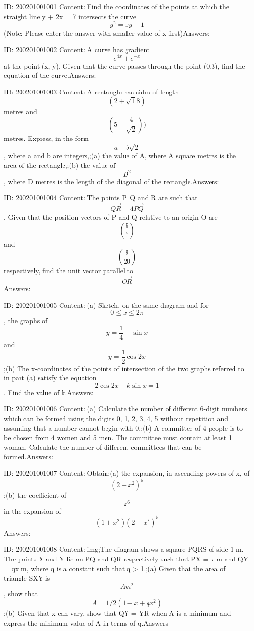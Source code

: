 \documentclass{article}
\begin{document}
ID: 200201001001
Content:
Find the coordinates of the points at which the straight line y + 2x = 7 intersects the curve $$y^2=xy-1$$ (Note: Please enter the answer with smaller value of x first)Answers:

ID: 200201001002
Content:
A curve has gradient $$e^{4x}+e^{-x}$$ at the point (x, y). Given that the curve passes through the point (0,3), find the equation of the curve.Answers:

ID: 200201001003
Content:
A rectangle has sides of length $$(2+\sqrt18)$$metres and $$(5-\frac{4}{\sqrt{2}}))$$metres. Express, in the form $$a+b\sqrt2$$, where a and b are integers,;(a)	the value of A, where A square metres is the area of the rectangle,;(b)	the value of $$D^2$$, where D metres is the length of the diagonal of the rectangle.Answers:

ID: 200201001004
Content:
The points P, Q and R are such that $$\vec{QR}=4\vec{PQ}$$. Given that the position vectors of P and Q relative to an origin O are $$\binom{6}{7}$$ and $$\binom{9}{20}$$ respectively, find the unit vector parallel to $$\vec{OR}$$Answers:

ID: 200201001005
Content:
(a)	Sketch, on the same diagram and for $$0 \leq x \leq 2\pi$$, the graphs of $$y= \frac{1}{4}+\sin x$$ and $$y= \frac{1}{2}\cos 2x$$;(b)	The x-coordinates of the points of intersection of the two graphs referred to in part (a) satisfy the equation $$2 \cos  2x-k \sin  x = 1$$. Find the value of k.Answers:

ID: 200201001006
Content:
(a)	Calculate the number of different 6-digit numbers which can be formed using the digits 0, 1, 2, 3, 4, 5 without repetition and assuming that a number cannot begin with 0.;(b)	A committee of 4 people is to be chosen from 4 women and 5 men. The committee must contain at least 1 woman. Calculate the number of different committees that can be formed.Answers:

ID: 200201001007
Content:
Obtain;(a)	the expansion, in ascending powers of x, of $$(2-x^2)^5$$;(b)	the coefficient of $$x^6$$ in the expansion of $$(1+x^2)(2-x^2)^5$$Answers:

ID: 200201001008
Content:
img;The diagram shows a square PQRS of side 1 m. The points X and Y lie on PQ and QR respectively such that PX = x m and QY = qx m, where q is a constant such that q > 1.;(a)	Given that the area of triangle SXY is $$A m^2$$, show that $$A=1/2(1-x+qx^2)$$;(b)	Given that x can vary, show that QY = YR when A is a minimum and express the minimum value of A in terms of q.Answers:
\end{document}
